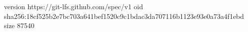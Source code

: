 version https://git-lfs.github.com/spec/v1
oid sha256:18cf525b2e7bc703a641bef1520c9c1bdac3da707116b1123e93e0a73a4f1ebd
size 87540
